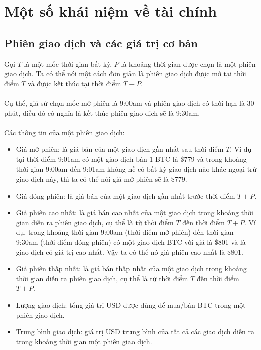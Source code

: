 \section{Một số khái niệm về tài chính}
\subsection{Phiên giao dịch và các giá trị cơ bản}
Gọi $T$ là một mốc thời gian bất kỳ, $P$ là khoảng thời gian được chọn là một 
phiên giao dịch. Ta có thể nói một cách đơn giản là phiên giao dịch được mở tại 
thời điểm $T$ và được kết thúc tại thời điểm $T + P$.\\\\
Cụ thể, giả sử chọn mốc mở phiên là 9:00am và phiên giao dịch có thời hạn là 
30 phút, điều đó có nghĩa là kết thúc phiên giao dịch sẽ là 9:30am.\\\\
Các thông tin của một phiên giao dịch:
\begin{itemize}
\item Giá mở phiên: là giá bán của một giao dịch gần nhất sau thời điểm $T$. Ví 
dụ tại thời điểm 9:01am có một giao dịch bán 1 BTC là \$779 và trong khoảng thời 
gian 9:00am đến 9:01am không hề có bất kỳ giao dịch nào khác ngoại trừ giao dịch 
này, thì ta có thể nói giá mở phiên sẽ là \$779.
\item Giá đóng phiên: là giá bán của một giao dịch gần nhất trước thời điểm 
$T + P$.
\item Giá phiên cao nhất: là giá bán cao nhất của một giao dịch trong khoảng 
thời gian diễn ra phiên giao dịch, cụ thể là từ thời điểm $T$ đến thời điểm 
$T + P$. Ví dụ, trong khoảng thời gian 9:00am (thời điểm mở phiên) đến thời gian 
9:30am (thời điểm đóng phiên) có một giao dịch BTC với giá là \$801 và là giao 
dịch có giá trị cao nhất. Vậy ta có thể nó giá phiên cao nhất là \$801.
\item Giá phiên thấp nhất: là giá bán thấp nhất của một giao dịch trong khoảng 
thời gian diễn ra phiên giao dịch, cụ thể là từ thời điểm $T$ đến thời điểm $T + P$.
\item Lượng giao dịch: tổng giá trị USD được dùng để  mua/bán BTC trong một phiên 
giao dịch.
\item Trung bình giao dịch: giá trị USD trung bình của tất cả các giao dịch diễn 
ra trong khoảng thời gian một phiên giao dịch.
\end{itemize}
